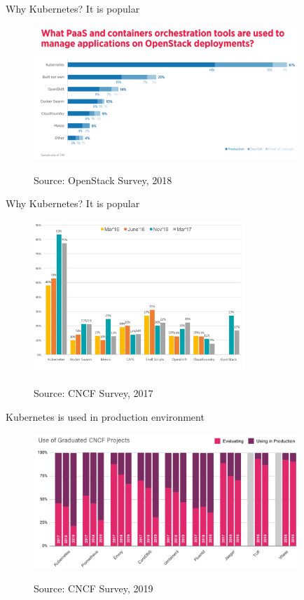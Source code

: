\documentclass{beamer}
\newcommand{\source}[1]{\caption*{Source: {#1}} }
\begin{document}
\begin{frame}{Why Kubernetes? It is popular}%
\begin{figure}
	\includegraphics[width=10cm]{figures/k8s-openstack-survey.png}
	\label{fig:k8s-openstack-survey}
	\source{OpenStack Survey, 2018}
\end{figure}
\end{frame}

\begin{frame}{Why Kubernetes? It is popular}%
\begin{figure}
	\includegraphics[width=8cm]{figures/cncf-container-orchestrators.png}
	\label{fig:cncf-container-orchestrators}
	\source{CNCF Survey, 2017}
\end{figure}
\end{frame}

\begin{frame}{Kubernetes is used in production environment}%
\begin{figure}
	\includegraphics[width=10cm]{figures/cncf-k8s-used-in-production.png}
	\label{fig:cncf-k8s-used-in-production}
	\source{CNCF Survey, 2019}
\end{figure}
\end{frame}
\end{document}
